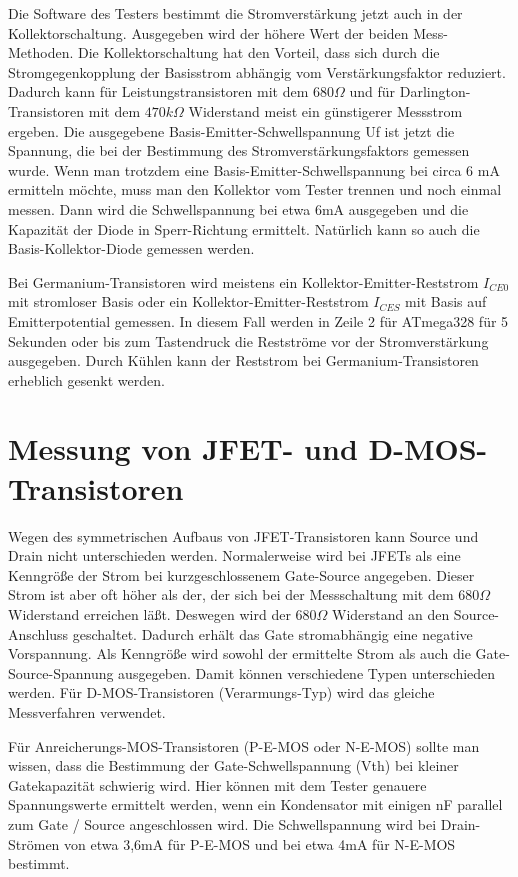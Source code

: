 Die Software des Testers bestimmt die Stromverstärkung jetzt auch in der Kollektorschaltung.
Ausgegeben wird der höhere Wert der beiden Mess-Methoden.
Die Kollektorschaltung hat den Vorteil, dass sich durch die Stromgegenkopplung der Basisstrom abhängig vom
Verstärkungsfaktor reduziert. Dadurch kann für Leistungstransistoren mit dem \(680 \Omega\) und für Darlington-Transistoren
mit dem \(470 k\Omega\) Widerstand meist ein günstigerer Messstrom ergeben.
Die ausgegebene Basis-Emitter-Schwellspannung Uf ist jetzt die Spannung,
die bei der Bestimmung des Stromverstärkungsfaktors gemessen wurde.
Wenn man trotzdem eine Basis-Emitter-Schwellspannung bei circa 6 mA ermitteln möchte, muss man den Kollektor
vom Tester trennen und noch einmal messen.
Dann wird die Schwellspannung bei etwa 6mA ausgegeben und die Kapazität der Diode in Sperr-Richtung ermittelt.
Natürlich kann so auch die Basis-Kollektor-Diode gemessen werden.

Bei Germanium-Transistoren wird meistens ein Kollektor-Emitter-Reststrom \(I_{CE0}\) mit stromloser Basis oder
ein Kollektor-Emitter-Reststrom \(I_{CES}\) mit Basis auf Emitterpotential gemessen.
In diesem Fall werden in Zeile 2 für ATmega328 für 5 Sekunden oder bis zum Tastendruck die Restströme
vor der Stromverstärkung ausgegeben.
Durch Kühlen kann der Reststrom bei Germanium-Transistoren erheblich gesenkt werden. 

\section{Messung von JFET- und D-MOS-Transistoren}
Wegen des symmetrischen Aufbaus von JFET-Transistoren kann Source und Drain nicht unterschieden werden.
Normalerweise wird bei JFETs als eine Kenngröße der Strom bei kurzgeschlossenem Gate-Source angegeben.
Dieser Strom ist aber oft höher als der, der sich bei der Messschaltung mit dem \(680 \Omega\) Widerstand erreichen läßt.
Deswegen wird der \(680 \Omega\) Widerstand an den Source-Anschluss geschaltet. Dadurch erhält das Gate
stromabhängig eine negative Vorspannung. Als Kenngröße wird sowohl der ermittelte Strom als auch die
Gate-Source-Spannung ausgegeben. 
Damit können verschiedene Typen unterschieden werden.
Für D-MOS-Transistoren (Verarmungs-Typ) wird das gleiche Messverfahren verwendet.

Für Anreicherungs-MOS-Transistoren (P-E-MOS oder N-E-MOS) sollte man wissen, dass die Bestimmung der Gate-Schwellspannung (Vth)
bei kleiner Gatekapazität schwierig wird. Hier können mit dem Tester genauere Spannungswerte ermittelt werden, wenn ein
Kondensator mit einigen nF parallel zum Gate / Source angeschlossen wird.
Die Schwellspannung wird bei Drain-Strömen von etwa 3,6mA für P-E-MOS und bei etwa 4mA für N-E-MOS bestimmt.
